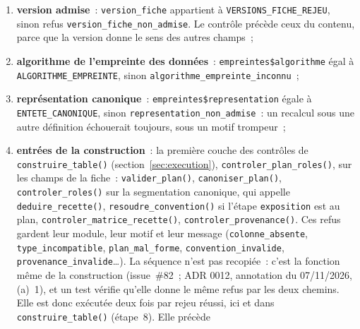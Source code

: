 \documentclass[a4paper,11pt]{article}
\newcommand{\code}[1]{\texttt{\small #1}}
\begin{document}
\begin{enumerate}[leftmargin=*, itemsep=2pt]
    en défaut est cité. Une fiche de version~4, qui n'a pas ce champ, est
    ainsi refusée à l'étape~3 (\code{version\_fiche\_non\_admise}) et non ici.
    Une classe d'encodage \code{bytes} sur l'un de ces champs
    est un attribut en défaut comme un autre, et un nom de cet encodage dans
    \code{empreintes} un défaut de forme de ce champ~: ils sont refusés ici,
    avec les autres défauts, et non par une erreur R (ADR 0012, point~3.4~;
    décision M202~; issue~\#128). \textbf{Tous} les champs en défaut sont cités dans un seul
    refus \code{fiche\_non\_conforme}~; aucun n'est complété ni converti. Le
    contenu de \code{roles}, \code{plan} et \code{provenance} est laissé à
    l'étape~6~;
  \item \textbf{version admise}~: \code{version\_fiche} appartient à
    \code{VERSIONS\_FICHE\_REJEU}, sinon refus
    \code{version\_fiche\_non\_admise}. Le contrôle précède ceux du contenu,
    parce que la version donne le sens des autres champs~;
  \item \textbf{algorithme de l'empreinte des données}~:
    \code{empreintes\$algorithme} égal à \code{ALGORITHME\_EMPREINTE}, sinon
    \code{algorithme\_empreinte\_inconnu}~;
  \item \textbf{représentation canonique}~: \code{empreintes\$representation}
    égale à \code{ENTETE\_CANONIQUE}, sinon \code{representation\_non\_admise}~:
    un recalcul sous une autre définition échouerait toujours, sous un motif
    trompeur~;
  \item \textbf{entrées de la construction}~: la première couche des
    contrôles de \code{construire\_table()} (section~\ref{sec:execution}),
    \code{controler\_plan\_roles()}, sur les champs de la fiche~:
    \code{valider\_plan()}, \code{canoniser\_plan()},
    \code{controler\_roles()} sur la segmentation canonique, qui appelle
    \code{deduire\_recette()}, \code{resoudre\_convention()} si l'étape
    \code{exposition} est au plan, \code{controler\_matrice\_recette()},
    \code{controler\_provenance()}. Ces
    refus gardent leur module, leur motif et leur message
    (\code{colonne\_absente}, \code{type\_incompatible},
    \code{plan\_mal\_forme}, \code{convention\_invalide},
    \code{provenance\_invalide}\ldots). La séquence n'est pas recopiée~:
    c'est la fonction même de la construction (issue~\#82~; ADR 0012,
    annotation du 07/11/2026, (a)~1), et un test vérifie qu'elle donne le
    même refus par les deux chemins. Elle est donc exécutée deux fois par
    rejeu réussi, ici et dans \code{construire\_table()} (étape~8). Elle précède

\end{enumerate}
\end{document}
